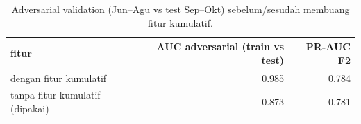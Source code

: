 \begin{table}[ht]
\centering\small
\begin{tabular}{lrr}
\toprule
fitur & AUC adversarial (train vs test) & PR-AUC F2 \\
\midrule
dengan fitur kumulatif & 0.985 & 0.784 \\
tanpa fitur kumulatif (dipakai) & 0.873 & 0.781 \\
\bottomrule
\end{tabular}
\caption{Adversarial validation (Jun–Agu vs test Sep–Okt) sebelum/sesudah membuang fitur kumulatif.}
\label{tab:t2_adversarial}
\end{table}
